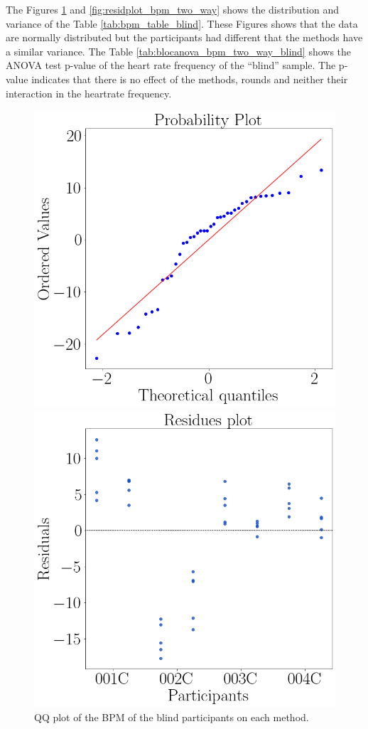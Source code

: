 The Figures \ref{fig:qqplot_bpm_two_way} and \ref{fig:residplot_bpm_two_way} shows the distribution and variance of the Table \ref{tab:bpm_table_blind}. These Figures shows that the data are normally distributed but the participants had different  that the methods have a similar variance.
The Table \ref{tab:blocanova_bpm_two_way_blind} shows the ANOVA test p-value of the heart rate frequency of the “blind” sample. The p-value indicates that there is no effect of the methods, rounds and neither their interaction in the heartrate frequency.



\begin{figure}[!htb]
    \centering
    \begin{minipage}{0.45\textwidth}
        \centering
        \includegraphics[width = 0.8\linewidth]{Resultados/ECG/Figuras/png/qqplot_bpm_two_way_blind.png}
        \caption{QQ plot of the BPM of the blind participants on each method.}
        \label{fig:qqplot_bpm_two_way}
    \end{minipage}
    \begin{minipage}{0.45\textwidth}
        \centering
        \includegraphics[width = 0.8\linewidth]{Resultados/ECG/Figuras/png/residplot_bpm_two_way_blind.png}

\end{minipage}
\end{figure}
